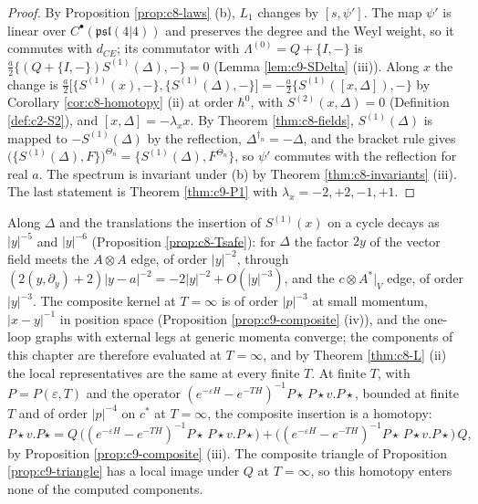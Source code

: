 \begin{proof}
By Proposition \ref{prop:c8-laws} (b), $L_1$ changes by $[s,\psi']$. The map $\psi'$ is linear over $C^\bullet(\mathfrak{psl}(4|4))$ and preserves the degree and the Weyl weight, so it commutes with $d_{CE}$; its commutator with $\Lambda^{(0)}=Q+\{I,-\}$ is $\tfrac a2\{(Q+\{I,-\})S^{(1)}(\Delta),-\}=0$ (Lemma \ref{lem:c9-SDelta} (iii)). Along $x$ the change is $\tfrac a2\big[\{S^{(1)}(x),-\},\{S^{(1)}(\Delta),-\}\big]=-\tfrac a2\{S^{(1)}([x,\Delta]),-\}$ by Corollary \ref{cor:c8-homotopy} (ii) at order $\hbar^0$, with $S^{(2)}(x,\Delta)=0$ (Definition \ref{def:c2-S2}), and $[x,\Delta]=-\lambda_x x$. By Theorem \ref{thm:c8-fields}, $S^{(1)}(\Delta)$ is mapped to $-S^{(1)}(\Delta)$ by the reflection, $\Delta^{\dagger_n}=-\Delta$, and the bracket rule gives $\big(\{S^{(1)}(\Delta),F\}\big)^{\Theta_n}=\{S^{(1)}(\Delta),F^{\Theta_n}\}$, so $\psi'$ commutes with the reflection for real $a$. The spectrum is invariant under (b) by Theorem \ref{thm:c8-invariants} (iii). The last statement is Theorem \ref{thm:c9-P1} with $\lambda_x=-2,+2,-1,+1$.
\end{proof}

\begin{remark}
\label{rem:c9-endpoint}
Along $\Delta$ and the translations the insertion of $S^{(1)}(x)$ on a cycle decays as $|y|^{-5}$ and $|y|^{-6}$ (Proposition \ref{prop:c8-Tsafe}): for $\Delta$ the factor $2y$ of the vector field meets the $A\otimes A$ edge, of order $|y|^{-2}$, through $(2(y,\partial_y)+2)|y-a|^{-2}=-2|y|^{-2}+O(|y|^{-3})$, and the $c\otimes A^*|_V$ edge, of order $|y|^{-3}$. The composite kernel at $T=\infty$ is of order $|p|^{-3}$ at small momentum, $|x-y|^{-1}$ in position space (Proposition \ref{prop:c9-composite} (iv)), and the one-loop graphs with external legs at generic momenta converge; the components of this chapter are therefore evaluated at $T=\infty$, and by Theorem \ref{thm:c8-L} (ii) the local representatives are the same at every finite $T$. At finite $T$, with $P=P(\varepsilon,T)$ and the operator $(e^{-\varepsilon H}-e^{-TH})^{-1}P\star\,P\star v.P\star$, bounded at finite $T$ and of order $|p|^{-4}$ on $c^*$ at $T=\infty$, the composite insertion is a homotopy:
\[
P\star v.P\star=Q\,\big((e^{-\varepsilon H}-e^{-TH})^{-1}P\star\,P\star v.P\star\big)+\big((e^{-\varepsilon H}-e^{-TH})^{-1}P\star\,P\star v.P\star\big)\,Q,
\]
by Proposition \ref{prop:c9-composite} (iii). The composite triangle of Proposition \ref{prop:c9-triangle} has a local image under $Q$ at $T=\infty$, so this homotopy enters none of the computed components.
\end{remark}

